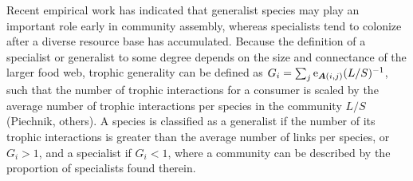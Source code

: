 \documentclass[twocolumn,preprintnumbers,amsmath,amssymb,superscriptaddress]{revtex4}
\newcommand{\rr}[1]{{\rm #1}}
\begin{document}



Recent empirical work has indicated that generalist species may play an important role early in community assembly, whereas specialists tend to colonize after a diverse resource base has accumulated.
Because the definition of a specialist or generalist to some degree depends on the size and connectance of the larger food web, trophic generality can be defined as $G_i = \sum_j \rr{e}_{{\bm A}(i,j)}(L/S)^{-1}$, such that the number of trophic interactions for a consumer is scaled by the average number of trophic interactions per species in the community $L/S$ (Piechnik, others).
A species is classified as a generalist if the number of its trophic interactions is greater than the average number of links per species, or $G_i > 1$, and a specialist if $G_i < 1$, where a community can be described by the proportion of specialists found therein. %
\end{document}

